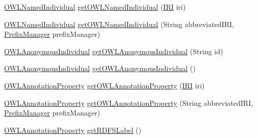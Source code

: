 \begin{DoxyCompactItemize}
\item 
\hyperlink{interfaceorg_1_1semanticweb_1_1owlapi_1_1model_1_1_o_w_l_named_individual}{O\-W\-L\-Named\-Individual} \hyperlink{interfaceorg_1_1semanticweb_1_1owlapi_1_1model_1_1_o_w_l_data_factory_a154c102f59254650426cf4c44c6aaacf}{get\-O\-W\-L\-Named\-Individual} (\hyperlink{classorg_1_1semanticweb_1_1owlapi_1_1model_1_1_i_r_i}{I\-R\-I} iri)
\item 
\hyperlink{interfaceorg_1_1semanticweb_1_1owlapi_1_1model_1_1_o_w_l_named_individual}{O\-W\-L\-Named\-Individual} \hyperlink{interfaceorg_1_1semanticweb_1_1owlapi_1_1model_1_1_o_w_l_data_factory_a733241a0120824ba96226165cfc13aad}{get\-O\-W\-L\-Named\-Individual} (String abbreviated\-I\-R\-I, \hyperlink{interfaceorg_1_1semanticweb_1_1owlapi_1_1model_1_1_prefix_manager}{Prefix\-Manager} prefix\-Manager)
\item 
\hyperlink{interfaceorg_1_1semanticweb_1_1owlapi_1_1model_1_1_o_w_l_anonymous_individual}{O\-W\-L\-Anonymous\-Individual} \hyperlink{interfaceorg_1_1semanticweb_1_1owlapi_1_1model_1_1_o_w_l_data_factory_a08355159c2969f70b5784a41472c020b}{get\-O\-W\-L\-Anonymous\-Individual} (String id)
\item 
\hyperlink{interfaceorg_1_1semanticweb_1_1owlapi_1_1model_1_1_o_w_l_anonymous_individual}{O\-W\-L\-Anonymous\-Individual} \hyperlink{interfaceorg_1_1semanticweb_1_1owlapi_1_1model_1_1_o_w_l_data_factory_a527d9428a3695adbba0c43fb17ba5130}{get\-O\-W\-L\-Anonymous\-Individual} ()
\item 
\hyperlink{interfaceorg_1_1semanticweb_1_1owlapi_1_1model_1_1_o_w_l_annotation_property}{O\-W\-L\-Annotation\-Property} \hyperlink{interfaceorg_1_1semanticweb_1_1owlapi_1_1model_1_1_o_w_l_data_factory_a3594d179308c22a0628a5e601b4d9c26}{get\-O\-W\-L\-Annotation\-Property} (\hyperlink{classorg_1_1semanticweb_1_1owlapi_1_1model_1_1_i_r_i}{I\-R\-I} iri)
\item 
\hyperlink{interfaceorg_1_1semanticweb_1_1owlapi_1_1model_1_1_o_w_l_annotation_property}{O\-W\-L\-Annotation\-Property} \hyperlink{interfaceorg_1_1semanticweb_1_1owlapi_1_1model_1_1_o_w_l_data_factory_ae64e0cd2aba48299a7add16d4e254f81}{get\-O\-W\-L\-Annotation\-Property} (String abbreviated\-I\-R\-I, \hyperlink{interfaceorg_1_1semanticweb_1_1owlapi_1_1model_1_1_prefix_manager}{Prefix\-Manager} prefix\-Manager)
\item 
\hyperlink{interfaceorg_1_1semanticweb_1_1owlapi_1_1model_1_1_o_w_l_annotation_property}{O\-W\-L\-Annotation\-Property} \hyperlink{interfaceorg_1_1semanticweb_1_1owlapi_1_1model_1_1_o_w_l_data_factory_a42999ae61828d81fc09e9668bddf1c2d}{get\-R\-D\-F\-S\-Label} ()

\end{DoxyCompactItemize}
